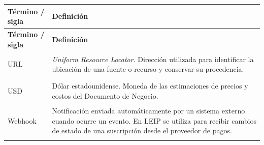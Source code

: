 \documentclass[11pt,a4paper]{article}
\makeatletter
\newcommand{\proyectoNombre}{LEIP}
\newenvironment{glosario}{%
  \renewcommand{\arraystretch}{1.18}%
  \begin{longtable}{@{}>{\raggedright\arraybackslash\bfseries}p{4.0cm} >{\raggedright\arraybackslash}p{10.7cm}@{}}
  \toprule
  \textbf{T\'ermino / sigla} & \textbf{Definici\'on} \\
  \midrule
  \endfirsthead
  \toprule
  \textbf{T\'ermino / sigla} & \textbf{Definici\'on} \\
  \midrule
  \endhead
  \bottomrule
  \endfoot
}{%
  \end{longtable}
  \renewcommand{\arraystretch}{1}%
}
\makeatother
\begin{document}
\begin{glosario}
URL & \emph{Uniform Resource Locator}. Direcci\'on utilizada para identificar la ubicaci\'on de una fuente o recurso y conservar su procedencia. \\
\addlinespace

USD & D\'olar estadounidense. Moneda de las estimaciones de precios y costos del Documento de Negocio. \\
\addlinespace

Webhook & Notificaci\'on enviada autom\'aticamente por un sistema externo cuando ocurre un evento. En \proyectoNombre{} se utiliza para recibir cambios de estado de una suscripci\'on desde el proveedor de pagos. \\
\addlinespace

\end{glosario}
\end{document}

